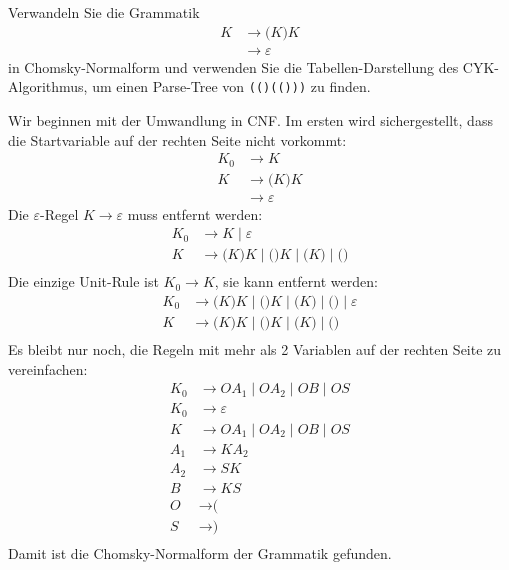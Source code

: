 Verwandeln Sie die Grammatik
\begin{align*}
K&\to \texttt{(}K\texttt{)}K \\
 &\to \varepsilon
\end{align*}
in Chomsky-Normalform und verwenden Sie die Tabellen-Darstellung
des CYK-Algorithmus, um einen Parse-Tree von \texttt{(()(()))}
zu finden.

\begin{loesung}
Wir beginnen mit der Umwandlung in CNF.
Im ersten wird sichergestellt, dass die Startvariable auf der rechten
Seite nicht vorkommt:
\begin{align*}
K_0&\to K \\
K  &\to \texttt{(}K\texttt{)}K \\
   &\to \varepsilon
\end{align*}
Die $\varepsilon$-Regel $K\to\varepsilon$ muss entfernt werden:
\begin{align*}
K_0&\to K \;|\; \varepsilon\\
K  &\to \texttt{(}K\texttt{)}K \;|\; \texttt{()}K \;|\; \texttt{(}K\texttt{)} \;|\; \texttt{()}\\
\end{align*}
Die einzige Unit-Rule ist $K_0\to K$, sie kann entfernt werden:
\begin{align*}
K_0&\to \texttt{(}K\texttt{)}K \;|\; \texttt{()}K \;|\; \texttt{(}K\texttt{)} \;|\; \texttt{()}
\;|\; \varepsilon\\
K  &\to \texttt{(}K\texttt{)}K \;|\; \texttt{()}K \;|\; \texttt{(}K\texttt{)} \;|\; \texttt{()}\\
\end{align*}
Es bleibt nur noch, die Regeln mit mehr als 2 Variablen auf der rechten
Seite zu vereinfachen:
\begin{align*}
K_0
&\to
OA_1
\;|\;
OA_2
\;|\;
OB
\;|\;
OS
\\
K_0&\to
\varepsilon
\\
K
&\to
OA_1
\;|\;
OA_2
\;|\;
OB
\;|\;
OS
\\
A_1&\to KA_2 \\
A_2&\to SK \\
B  &\to KS \\
O&\to \texttt{(} \\
S&\to \texttt{)} \\
\end{align*}
Damit ist die Chomsky-Normalform der Grammatik gefunden.



\end{loesung}
